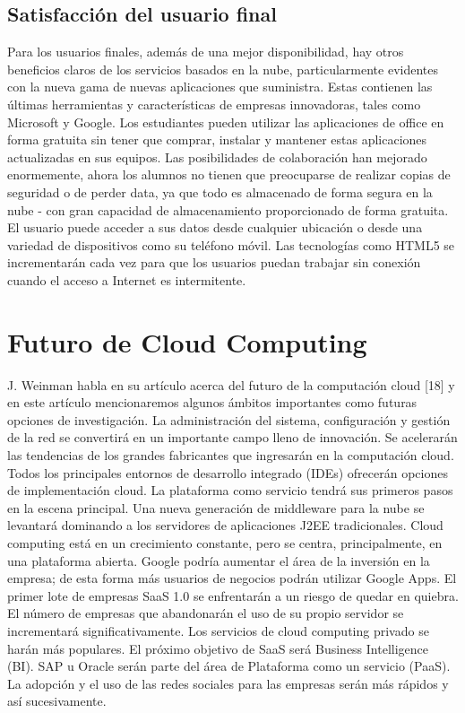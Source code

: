\documentclass[journal]{IEEEtran}
\begin{document}
\subsection{Satisfacción del usuario final}
Para los usuarios finales, además de una mejor disponibilidad, hay otros beneficios claros de los servicios basados en la nube, particularmente evidentes con la nueva gama de nuevas aplicaciones que suministra. Estas contienen las últimas herramientas y características de empresas innovadoras, tales como Microsoft y Google. Los estudiantes pueden utilizar las aplicaciones de office en forma gratuita sin tener que comprar, instalar y mantener estas aplicaciones actualizadas en sus equipos. Las posibilidades de colaboración han mejorado enormemente, ahora los alumnos no tienen que preocuparse de realizar copias de seguridad o de perder data, ya que todo es almacenado de forma segura en la nube - con gran capacidad de almacenamiento proporcionado de forma gratuita. El usuario puede acceder a sus datos desde cualquier ubicación o desde una variedad de dispositivos como su teléfono móvil. Las tecnologías como HTML5 se incrementarán cada vez para que los usuarios puedan trabajar sin conexión cuando el acceso a Internet es intermitente.


\section{Futuro de Cloud Computing}
J. Weinman habla en su artículo acerca del futuro de la computación cloud  [18] y en este artículo mencionaremos algunos ámbitos importantes como futuras opciones de investigación. La administración del sistema, configuración y gestión de la red se convertirá en un importante campo lleno de innovación. Se acelerarán las tendencias de los grandes fabricantes que ingresarán en la computación cloud. Todos los principales entornos de desarrollo integrado (IDEs) ofrecerán opciones de implementación cloud. La plataforma como servicio tendrá sus primeros pasos en la escena principal. Una nueva generación de middleware para la nube se levantará dominando a los servidores de aplicaciones J2EE tradicionales. Cloud computing está en un crecimiento constante, pero se centra, principalmente, en una plataforma abierta. Google podría aumentar el área de la inversión en la empresa; de esta forma más usuarios de negocios podrán utilizar Google Apps. El primer lote de empresas SaaS 1.0 se enfrentarán a un riesgo de quedar en quiebra. El número de empresas que abandonarán el uso de su propio servidor se incrementará significativamente. Los servicios de cloud computing privado se harán más populares. El próximo objetivo de SaaS será Business Intelligence (BI). SAP u Oracle serán parte del área de Plataforma como un servicio (PaaS). La adopción y el uso de las redes sociales para las empresas serán más rápidos y así sucesivamente.
\end{document}
